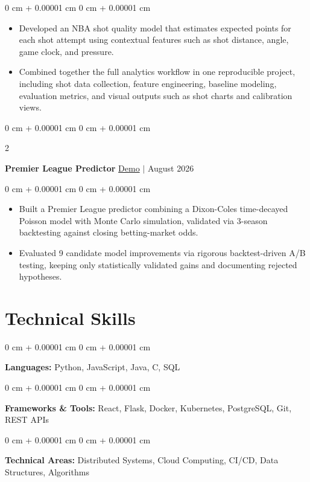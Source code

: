 \documentclass[10pt, letterpaper]{article}
\newenvironment{highlights}{
    \begin{itemize}[
        topsep=0.06 cm,
        parsep=0.06 cm,
        partopsep=0pt,
        itemsep=0pt,
        leftmargin=0 cm + 10pt
    ]
}{
    \end{itemize}
}
\newenvironment{onecolentry}{
    \begin{adjustwidth}{
        0 cm + 0.00001 cm
    }{
        0 cm + 0.00001 cm
    }
}{
    \end{adjustwidth}
}
\newenvironment{twocolentry}[2][]{
    \onecolentry
    \def\secondColumn{#2}
    \setcolumnwidth{\fill, 4.5 cm}
    \begin{paracol}{2}
}{
    \switchcolumn \raggedleft \secondColumn
    \end{paracol}
    \endonecolentry
}
\begin{document}
\vspace{0.06 cm}
\begin{onecolentry}
    \begin{highlights}
        \item Developed an NBA shot quality model that estimates expected points for each shot attempt using contextual features such as shot distance, angle, game clock, and pressure.
        \item Combined together the full analytics workflow in one reproducible project, including shot data collection, feature engineering, baseline modeling, evaluation metrics, and visual outputs such as shot charts and calibration views.
    \end{highlights}
\end{onecolentry}

\begin{twocolentry}{
    \href{https://amin9666.github.io/Premier_League_Prediction_26/}{Demo} $|$ August 2026
}
    \textbf{Premier League Predictor}\end{twocolentry}

\vspace{0.06 cm}
\begin{onecolentry}
    \begin{highlights}
        \item Built a Premier League predictor combining a Dixon-Coles time-decayed Poisson model with Monte Carlo simulation, validated via 3-season backtesting against closing betting-market odds.
        \item Evaluated 9 candidate model improvements via rigorous backtest-driven A/B testing, keeping only statistically validated gains and documenting rejected hypotheses.
    \end{highlights}
\end{onecolentry}

\section{Technical Skills}

\begin{onecolentry}
    \textbf{Languages:} Python, JavaScript, Java, C, SQL
\end{onecolentry}

\vspace{0.14 cm}

\begin{onecolentry}
    \textbf{Frameworks \& Tools:} React, Flask, Docker, Kubernetes, PostgreSQL, Git, REST APIs
\end{onecolentry}

\vspace{0.14 cm}

\begin{onecolentry}
    \textbf{Technical Areas:} Distributed Systems, Cloud Computing, CI/CD, Data Structures, Algorithms
\end{onecolentry}
\end{document}
